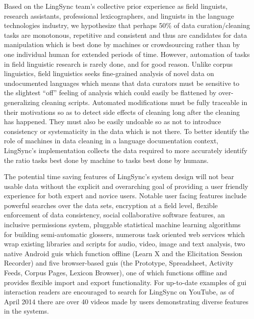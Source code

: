 \documentclass[11pt]{article}
\newcommand{\smalltodo}[2][]
    {\todo[caption={#2}, #1]
    {\tiny#2\normalsize}}
\begin{document}
Based on the LingSync team's collective prior experience as field linguists, research
assistants, professional lexicographers, and linguists in the language
technologies industry, we hypothesize that perhaps 50\% of data
curation/cleaning tasks are monotonous, repetitive and consistent and thus are
candidates for data manipulation which is best done by machines or
crowdsourcing rather than by one individual human for extended periods of time.
However, automation of tasks in field linguistic research is rarely done, and
for good reason. Unlike corpus linguistics, field linguistics seeks
fine-grained analysis of novel data on undocumented languages which means that
data curators must be sensitive to the slightest ``off'' feeling of analysis
which could easily be flattened by over-generalizing cleaning scripts. 
Automated modifications must be fully traceable in their motivations so as to
detect side effects of cleaning long after the cleaning has happened. They must
also be easily undoable so as not to introduce consistency or systematicity in
the data which is not there.%
To better identify the role of machines in data
cleaning in a language documentation context, LingSync's implementation
collects the data required to more accurately identify the ratio tasks best done by machine to tasks best done by humans. 

The potential time saving features of LingSync's system design will not bear
usable data without the explicit and overarching goal of providing a user
friendly experience for both expert and novice users.  Notable user facing
features include powerful searches over the data sets, encryption at a field
level, flexible enforcement of data consistency, social collaborative software
features, an inclusive permissions system, pluggable statistical machine
learning algorithms for building semi-automatic glossers, numerous task
oriented web services which wrap existing libraries and scripts for audio,
video, image and text analysis, two native Android \glspl{gui} which function
offline (Learn X and the Elicitation Session Recorder) and five browser-based
\glspl{gui} (the Prototype, Spreadsheet,  Activity Feeds, Corpus Pages, 
Lexicon Browser), one of which functions offline and provides flexible import
and export functionality.  For up-to-date examples of \gls{gui} interaction
readers are encouraged to search for LingSync on YouTube, as of April 2014
there are over 40 videos made by users demonstrating diverse features in the
systems.
\end{document}
